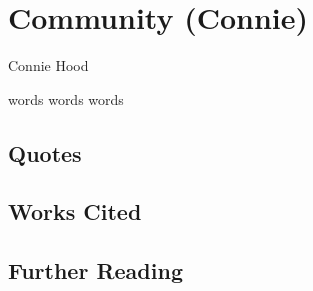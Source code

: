 \chapter{Community (Connie)}

\begin{authors}
	Connie Hood
\end{authors}

words words words


\section{Quotes}

\section{Works Cited}

\section{Further Reading}


